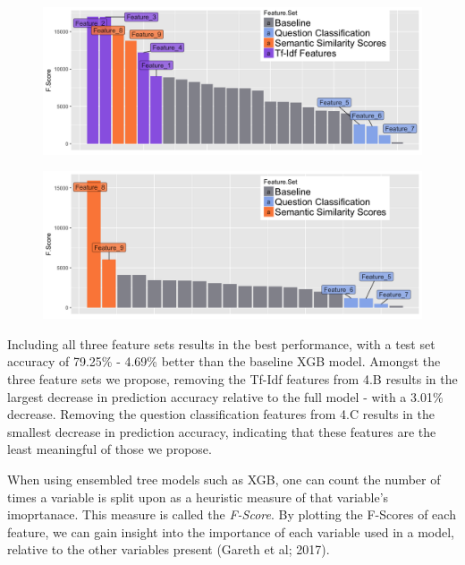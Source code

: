 \documentclass[letterpaper, 10 pt, conference]{ieeeconf}  %
\begin{document}
\begin{figure}[t]
\centering
\begin{minipage}{.5\textwidth}
  \centering
  \includegraphics[width=1\linewidth]{full_bars}
  \label{fig:test1}
\end{minipage}%
\begin{minipage}{.5\textwidth}
  \centering
  \includegraphics[width=1\linewidth]{no_tfidf_bars}
  \label{fig:test2}
\end{minipage}
\end{figure}

Including all three feature sets results in the best performance, with a test set accuracy of 79.25\% - 4.69\% better than the baseline XGB model. Amongst the three feature sets we propose, removing the Tf-Idf features from 4.B results in the largest decrease in prediction accuracy relative to the full model - with a 3.01\% decrease. Removing the question classification features from 4.C results in the smallest decrease in prediction accuracy, indicating that these features are the least meaningful of those we propose. 

When using ensembled tree models such as XGB, one can count the number of times a variable is split upon as a heuristic measure of that variable's imoprtanace. This measure is called the \emph{F-Score}. By plotting the F-Scores of each feature, we can gain insight into the importance of each variable used in a model, relative to the other variables present (Gareth et al; 2017).
\end{document}
